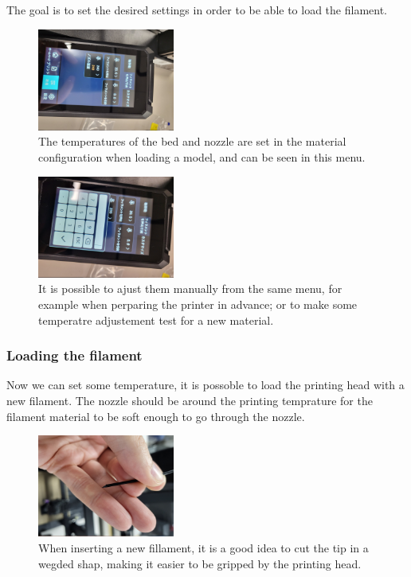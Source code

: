 \documentclass[a4paper,11pt]{article}
\begin{document}
The goal is to set the desired settings in order to be able to load the filament.

\label{sec:org2c62615}
\begin{figure}[H]
    \centering 
    \includegraphics[width=0.4\textwidth]{img/ender/5.jpg} 
    \caption{The temperatures of the bed and nozzle are set in the material configuration when loading a model, and can be seen in this menu.}
    \label{fig:ender5}
\end{figure}

\begin{figure}[H]
    \centering 
    \includegraphics[width=0.4\textwidth]{img/ender/6.jpg} 
    \caption{It is possible to ajust them manually from the same menu, for example when perparing the printer in advance; or to make some temperatre adjustement test for a new material.}
    \label{fig:ender6}
\end{figure}


\subsubsection{Loading the filament}
Now we can set some temperature, it is possoble to load the printing head with a new filament. The nozzle should be around the printing temprature for the filament material to be soft enough to go through the nozzle.

\begin{figure}[H]
    \centering 
    \includegraphics[width=0.4\textwidth]{img/ender/7.jpg} 
    \caption{When inserting a new fillament, it is a good idea to cut the tip in a wegded shap, making it easier to be gripped by the printing head.}
    \label{fig:ender7}
\end{figure}
\end{document}
